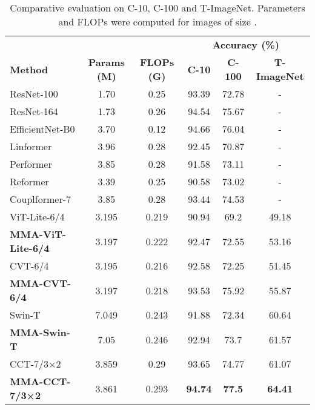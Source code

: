 \documentclass[10pt,twocolumn,letterpaper]{article}
\begin{document}
\begin{table*}[t]
\centering
\caption{Comparative evaluation on C-10, C-100 and T-ImageNet. Parameters and FLOPs were computed for images of size .}
\label{tab:image_small}
\setlength{\tabcolsep}{17pt}
\begin{tabular}{lccccc}
\hline
& & & \multicolumn{3}{c}{\textbf{Accuracy (\%)}}\\
\textbf{Method}  & \textbf{Params (M)} & \textbf{FLOPs (G)} & \textbf{C-10} & \textbf{C-100}  & \textbf{T-ImageNet} \\ 
\hline
ResNet-100 \cite{Author37} &1.70 & 0.25 & 93.39 & 72.78 & - \\
ResNet-164   \cite{Author37}    & 1.73  &    0.26   & 94.54  & 75.67 & -\\
EfficientNet-B0 \cite{Author39} & 3.70 & 0.12 & 94.66 & 76.04 & -  \\ \hline
Linformer \cite{Author33} & 3.96 & 0.28 & 92.45 & 70.87 & - \\
Performer \cite{Author35}& 3.85 & 0.28 & 91.58 & 73.11 & -\\
Reformer \cite{Author34} & 3.39 & 0.25 & 90.58 & 73.02 & - \\
Couplformer-7 \cite{Author36}& 3.85 & 0.28 & 93.44 &74.53 & -\\ \hline

ViT-Lite-6/4 \cite{Author1}     & 3.195   &    0.219   & 90.94  & 69.2 & 49.18\\
\textbf{MMA-ViT-Lite-6/4} &     3.197 &  0.222   & 92.47   &   72.55 & 53.16 \\ \hline
CVT-6/4 \cite{Author1}          &  3.195 &   0.216  & 92.58  & 72.25   & 51.45\\
\textbf{MMA-CVT-6/4}      &  3.197  &        0.218   & 93.53  &     75.92  & 55.87\\ 
\hline
Swin-T \cite{Author9}          & 7.049 & 0.243 & 91.88  & 72.34   & 60.64 \\
\textbf{MMA-Swin-T}      & 7.05 & 0.246 &  92.94 &  73.7  & 61.57 \\ 
\hline
CCT-7/3×2 \cite{Author1}        & 3.859 &  0.29  & 93.65  & 74.77  & 61.07 \\
\textbf{MMA-CCT-7/3×2}   &  3.861  &   0.293     & \textbf{94.74} & \textbf{77.5} & \textbf{64.41}\\ 
\hline
\end{tabular}
\end{table*}
\end{document}
